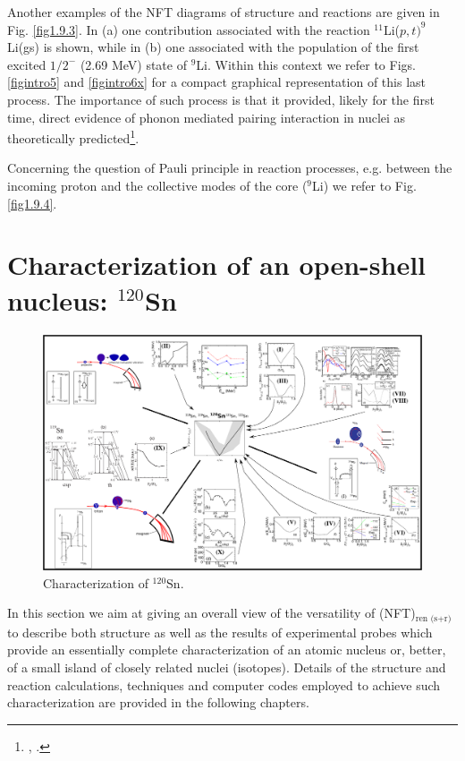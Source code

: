 Another examples of the NFT diagrams of structure and reactions are given in Fig. \ref{fig1.9.3}. In (a) one contribution associated with the reaction $^{11}$Li($p,t)^9$Li(gs) is shown, while in (b) one associated with the population of the first excited $1/2^-$ (2.69 MeV) state of $^9$Li. Within this context we refer to Figs. \ref{figintro5} and \ref{figintro6x}   for a compact graphical representation of this last process. The importance of such process is that it provided, likely for the first time, direct evidence of phonon mediated pairing interaction in nuclei as theoretically predicted\footnote{\cite{Barranco:01}, \cite{Tanihata:08,Potel:10,Tanihata:13,Beceiro:15}.}.

          Concerning the question of Pauli principle in reaction processes, e.g.  between the incoming proton and the collective modes
          of the core ($^9$Li) we refer to Fig. \ref{fig1.9.4}. 
          
          
\section{Characterization of an open-shell nucleus: $^{120}$Sn}\label{S1.10}
          \begin{figure}
          \centerline {
          \includegraphics*[width=24cm, angle=90]{introduccion/figs/fig1_4_1v2}}
          \caption{Characterization of $^{120}$Sn.}
          \label{fig1.4.1}
          \end{figure}
          In this section we aim at giving an overall view of
the versatility of (NFT)$_{\text{ren (s+r)}}$ to describe both structure as well as the results of experimental probes which provide an essentially complete characterization of an atomic nucleus or, better, of a small island of closely related nuclei (isotopes). Details of the structure and reaction calculations, techniques and computer codes employed to achieve such characterization are provided in the following chapters. 

